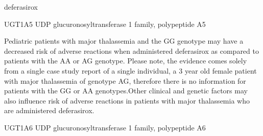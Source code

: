 \documentclass{resume} %
\begin{document}
\begin{rSection}{ deferasirox }
\begin{rSubsection}{ UGT1A5 }{ UDP glucuronosyltransferase 1 family, polypeptide A5 }{}{}
\item[] Pediatric patients with major thalassemia and the GG genotype may have a decreased risk of adverse reactions when administered deferasirox as compared to patients with the AA or AG genotype. Please note, the evidence comes solely from a single case study report of a single individual, a 3 year old female patient with major thalassemia of genotype AG, therefore there is no information for patients with the GG or AA genotypes.Other clinical and genetic factors may also influence risk of adverse reactions in patients with major thalassemia who are administered deferasirox.
\end{rSubsection}\begin{rSubsection}{ UGT1A6 }{ UDP glucuronosyltransferase 1 family, polypeptide A6 }{}{}
\item[]


\end{rSubsection}
\end{rSection}
\end{document}
